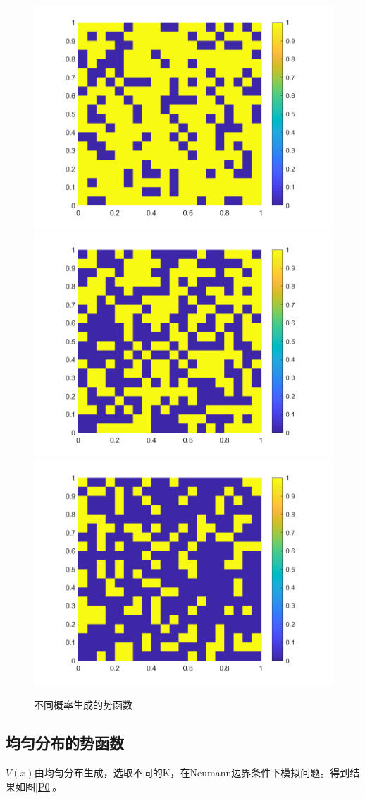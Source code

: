 \documentclass[12pt,a4paper]{article}
\begin{document}
\begin{figure}[htbp]
\centering
\includegraphics[width=0.3\linewidth]{potential/P3V}
\includegraphics[width=0.3\linewidth]{potential/P5V}
\includegraphics[width=0.3\linewidth]{potential/P7V}
\caption{不同概率生成的势函数}
\label{p0}
\end{figure}

\subsection{均匀分布的势函数}

$V(x)$由均匀分布生成，选取不同的K，在Neumann边界条件下模拟问题。得到结果如图\ref{P0}。
\end{document}

